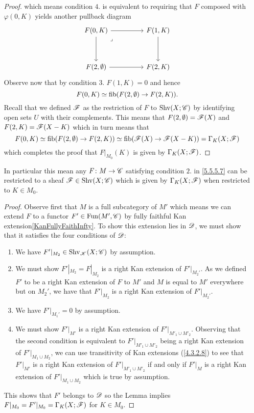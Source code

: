 \documentclass[../../thesis.tex]{subfiles}
\begin{document}
\begin{proof}
    which means condition $4.$ is equivalent to requiring that $F$ composed with $\varphi(0,K)$ yields another pullback diagram
    \[\begin{tikzcd}
            {F(0,K)} && {F(1,K)} \\
            \\
            {F(2,\emptyset)} && {F(2,K)}
            \arrow[from=1-1, to=1-3]
            \arrow[from=1-3, to=3-3]
            \arrow[from=3-1, to=3-3]
            \arrow[from=1-1, to=3-1]
            \arrow["\lrcorner"{anchor=center, pos=0.125}, draw=none, from=1-1, to=3-3]
        \end{tikzcd}\]
    Observe now that by condition $3.$ $F(1,K)=0$ and hence
    \[
        F(0,K)\simeq \operatorname{fib}(F(2,\emptyset) \to F(2,K)).
    \]
    Recall that we defined $\mathscr{F}$ as the restriction of $F$ to $\mathrm{Shv}(X;\mathscr{C})$ by identifying open sets $U$ with their complements.
    This means that $F(2,\emptyset) = \mathscr{F}(X)$ and $F(2,K) = \mathscr{F}(X-K)$ which in turn means that
    \[
        F(0,K)\simeq \operatorname{fib}(F(2,\emptyset) \to F(2,K)) \simeq \operatorname{fib}(\mathscr{F}(X) \to \mathscr{F}(X-K)) = \Gamma_K(X;\mathscr{F})
    \]
    which completes the proof that $F|_{M_0}(K)$ is given by $\Gamma_K(X;\mathscr{F})$.
\end{proof}
\begin{corollary}
    In particular this mean any $F\colon M \to \mathscr{C}$ satisfying condition $2.$ in \ref{5.5.5.7} can be restricted to a sheaf $\mathscr{F}\in\mathrm{Shv}(X;\mathscr{C})$ which is given by $\Gamma_K(X;\mathscr{F})$ when restricted to $K \in M_0$.
\end{corollary}
\begin{proof}
    Observe first that $M$ is a full subcategory of $M'$ which means we can extend $F$ to a functor $F'\in\mathrm{Fun}(M',\mathscr{C})$ by fully faithful Kan extension\ref{KanFullyFaithInfty}.
    To show this extension lies in $\mathscr{D}$, we must show that it satisfies the four conditions of $\mathscr{D}$:
    \begin{enumerate}
        \item We have $F'|_{M_2} \in \mathrm{Shv}_{\mathscr{K}}(X;\mathscr{C})$ by assumption.
        \item We must show $F'|_{M_2}=F|_{M_2}$ is a right Kan extension of $F'|_{M_2'}$.
              As we defined $F'$ to be a right Kan extension of $F$ to $M'$ and $M$ is equal to $M'$ everywhere but on $M_2'$, we have that $F'|_{M_2}$ is a right Kan extension of $F'|_{M_2'}$.
        \item We have $F'|_{M_1'}=0$ by assumption.
        \item We must show $F'|_{M'}$ is a right Kan extension of $F'|_{M'_1 \cup M'_2}$.
              Observing that the second condition is equivalent to $F'|_{M'_1 \cup M'_2}$ being a right Kan extension of $F'|_{M_1 \cup M_2}$, we can use transitivity of Kan extensions (\ref{4.3.2.8}) to see that $F'|_{M'}$ is a right Kan extension of $F'|_{M'_1 \cup M'_2}$ if and only if $F'|_{M}$ is a right Kan extension of $F'|_{M_1 \cup M_2}$ which is true by assumption.
    \end{enumerate}
    This shows that $F'$ belongs to $\mathscr{D}$ so the Lemma implies $F|_{M_0} = F'|_{M_0} = \Gamma_K(X;\mathscr{F})$ for $K\in M_0$.
\end{proof}
\end{document}
